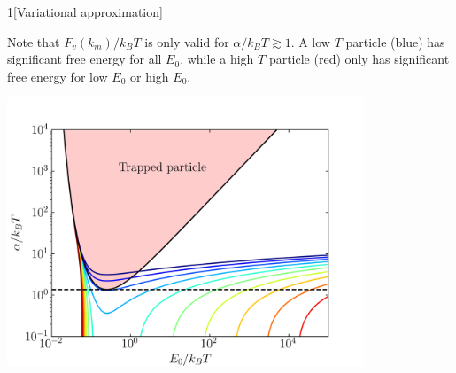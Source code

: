 \documentclass[12pt]{article}
\begin{document}
\begin{problem}{1}[Variational approximation]
\begin{solution}
Note that $F_v(k_m)/k_BT$ is only valid for $\alpha/k_BT\gtrsim1$. A low $T$
particle (blue) has significant free energy for all $E_0$, while a high $T$
particle (red) only has significant free energy for low $E_0$ or high $E_0$.
\begin{center}
    \includegraphics[width=0.8\textwidth]{p1c_2.png} 
\end{center}
\end{solution}
\end{problem}
\newpage
\end{document}

